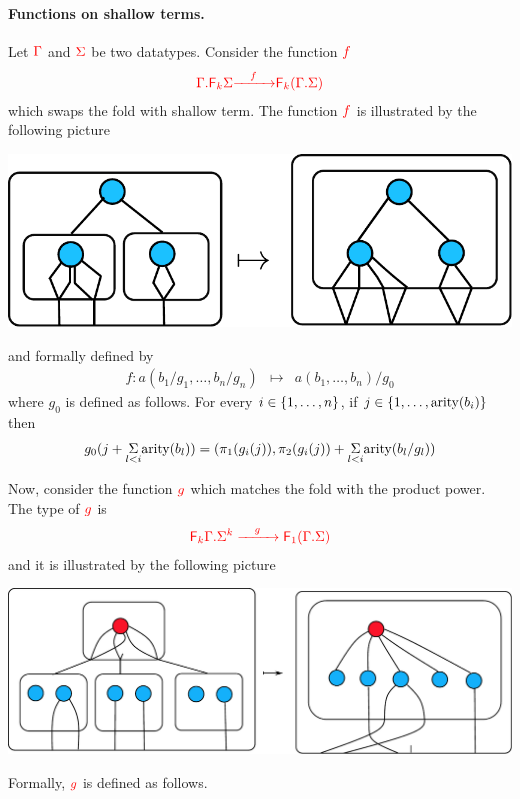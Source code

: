 \paragraph*{Functions on shallow terms.} Let ${\color{red}{\Gamma}}$ and ${\color{red}{\Sigma}}$ be two datatypes.  Consider the function ${\color{red}{f}}$
\begin{align*}
{\color{red}{{\color{red}{\Gamma . {\color{red}{\mathsf F_{k}}}\Sigma}}}} {\color{red}{\xrightarrow{\quad f \quad}}} {\color{red}{{\color{red}{\mathsf F_{k}}}({\color{red}{\Gamma . \Sigma}})}}
\end{align*}
which swaps the fold with shallow term. The function ${\color{red}{f}}$ is illustrated by the following picture
\begin{center}
\includegraphics[scale=.4]{pictures/shallow-fold-distrib}
\end{center}
and formally defined by 
$$\begin{array}{rcl}
f:a(b_1/g_1,\dots,b_n/g_n)&\mapsto& a(b_1,\dots,b_n)/g_0
\end{array}$$
where $g_0$ is defined as follows. For every  $i \in\{1,\dots,n\}$,  if  $j\in\{1,\dots,\mathrm{arity}(b_i)\}$ then 
\begin{align*}
 g_0(j+\underset{l<i}{\Sigma} \mathrm{arity}(b_l))=(\pi_1(g_i(j)),\pi_2(g_i(j))+\underset{l<i}{\Sigma} \mathrm{arity}(b_l/g_l))
\end{align*}
\smallskip

Now, consider the function ${\color{red}{g}}$ which matches the fold with the product power. The type of ${\color{red}{g}}$ is
\begin{align*}
{\color{red}{{\color{red}{{\color{red}{\mathsf F_{k}}}\Gamma . \Sigma^k}} \xrightarrow{\quad g\quad} {\color{red}{\mathsf F_{1}}}({\color{red}{\Gamma . \Sigma}})}} 
\end{align*}
and it is illustrated by the following picture  
\begin{center}
\includegraphics[scale=.37]{pictures/shallow-unfold}
\end{center}
Formally, ${\color{red}{g}}$ is defined as follows.

